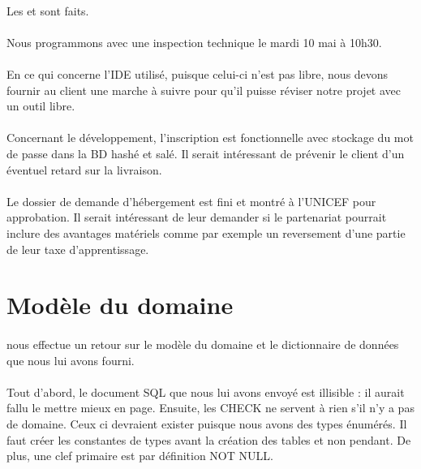 \documentclass [a4paper] {article}
\begin{document}
\paragraph*{}
Les \PTI{} et \PTU{} sont faits.
\paragraph*{}
Nous programmons avec \nomTuteurPedago{} une inspection technique le mardi 10 mai à 10h30.
\paragraph*{}
En ce qui concerne l'IDE utilisé, puisque celui-ci n'est pas libre, nous devons fournir au client une marche à suivre pour qu'il puisse réviser notre projet avec un outil libre.
\paragraph*{}
Concernant le développement, l'inscription est fonctionnelle avec stockage du mot de passe dans la BD hashé et salé. Il serait intéressant de prévenir le client d'un éventuel retard sur la livraison.
\paragraph*{}
Le dossier de demande d'hébergement est fini et montré à l'UNICEF pour approbation. Il serait intéressant de leur demander si le partenariat pourrait inclure des avantages matériels comme par exemple un reversement d'une partie de leur taxe d'apprentissage.

\section{Modèle du domaine}
\paragraph*{}
\nomTuteurPedago{} nous effectue un retour sur le modèle du domaine et le dictionnaire de données que nous lui avons fourni.
\paragraph*{}
Tout d'abord, le document SQL que nous lui avons envoyé est illisible : il aurait fallu le mettre mieux en page. Ensuite, les CHECK ne servent à rien s'il n'y a pas de domaine. Ceux ci devraient exister puisque nous avons des types énumérés. Il faut créer les constantes de types avant la création des tables et non pendant. De plus, une clef primaire est par définition NOT NULL.
\end{document}
